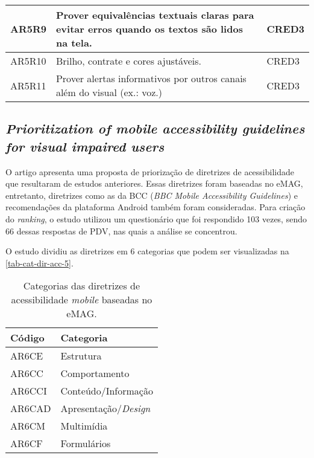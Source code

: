 \begin{table}[htb]
\begin{center}
\begin{tabular}{p{1.2cm}|p{12.1cm}|p{1.4cm}}
      \hline
      AR5R9           & Prover equivalências textuais claras para evitar erros quando os textos são lidos na tela.                        & CRED3              \\
      \hline
      AR5R10          & Brilho, contrate e cores ajustáveis.                                                                              & CRED3              \\
      \hline
      AR5R11          & Prover alertas informativos por outros canais além do visual (ex.\@: voz.)                                        & CRED3              \\
    \end{tabular}
  \end{center}
\end{table}

\subsection{\emph{Prioritization of mobile accessibility guidelines for visual impaired users}}

O artigo apresenta uma proposta de priorização de diretrizes de acessibilidade que resultaram de estudos anteriores.
Essas diretrizes foram baseadas no eMAG, entretanto, diretrizes como as da BCC (\emph{BBC Mobile Accessibility Guidelines}) e recomendações da plataforma Android também foram consideradas.
Para criação do \emph{ranking}, o estudo utilizou um questionário que foi respondido 103 vezes, sendo 66 dessas respostas de PDV, nas quais a análise se concentrou.

O estudo dividiu as diretrizes em 6 categorias que podem ser visualizadas na \autoref{tab-cat-dir-acc-5}.

\begin{table}[htb]
  \begin{center}
    \ABNTEXfontereduzida
    \caption{Categorias das diretrizes de acessibilidade \emph{mobile} baseadas no eMAG.}
    \label{tab-cat-dir-acc-5}
    \begin{tabular}{p{1.5cm}|p{4.5cm}}
      \textbf{Código} & \textbf{Categoria}         \\
      \hline
      AR6CE           & Estrutura                  \\
      \hline
      AR6CC           & Comportamento              \\
      \hline
      AR6CCI          & Conteúdo/Informação        \\
      \hline
      AR6CAD          & Apresentação/\emph{Design} \\
      \hline
      AR6CM           & Multimídia                 \\
      \hline
      AR6CF           & Formulários                \\
    \end{tabular}
  \end{center}
\end{table}

